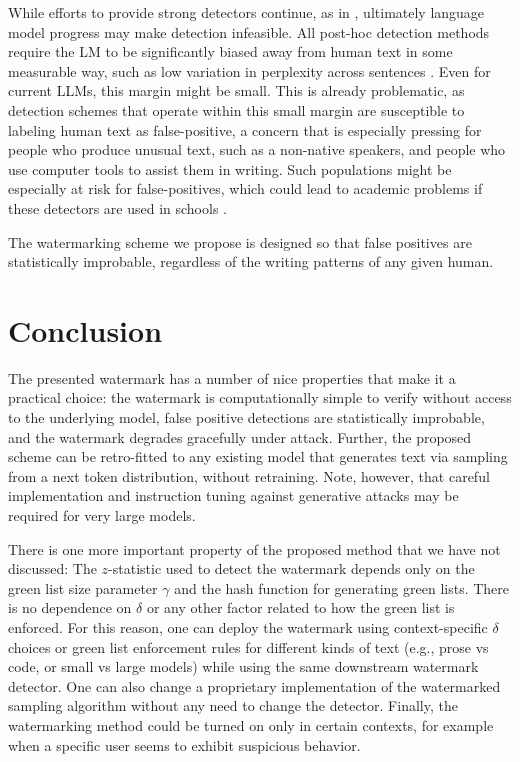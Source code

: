\documentclass{article}
\theoremstyle{plain}
\theoremstyle{definition}
\theoremstyle{remark}
\begin{document}
While efforts to provide strong detectors continue, as in \citet{tian_gptzero_2023}, ultimately language model progress may make detection infeasible. All post-hoc detection methods require the LM to be significantly biased away from human text in some measurable way, such as low variation in perplexity across sentences \citep{tian_gptzero_2023}. Even for current LLMs, this margin might be small. This is already problematic, as detection schemes that operate within this small margin are susceptible to labeling human text as false-positive, a concern that is especially pressing for people who produce unusual text, such as a non-native speakers, and people who use computer tools to assist them in writing. 
Such populations might be especially at risk for false-positives, which could lead to academic problems if these detectors are used in schools \citep{butoi_things_2023}. 

The watermarking scheme we propose is designed so that false positives are statistically improbable, regardless of the writing patterns of any given human.

\vspace{-.2cm}
\section{Conclusion}

The presented watermark has a number of nice properties that make it a practical choice: 
the watermark is computationally simple to verify without access to the underlying model, false positive detections are statistically improbable, and the watermark degrades gracefully under attack. Further, the proposed scheme can be retro-fitted to any existing model that generates text via sampling from a next token distribution, without retraining. Note, however, that careful implementation and instruction tuning against generative attacks may be required for very large models. 

There is one more important property of the proposed method that we have not discussed: The $z$-statistic  used to detect the watermark depends only on the green list size parameter $\gamma$ and the hash function for generating green lists. There is no dependence on $\delta$ or any other factor related to how the green list is enforced. 
For this reason, one can deploy the watermark using context-specific $\delta$ choices or green list enforcement rules for different kinds of text (e.g., prose vs code, or small vs large models) while using the same downstream watermark detector.  One can also change a proprietary implementation of the watermarked sampling algorithm without any need to change the detector.
Finally, the watermarking method could be turned on only in certain contexts, for example when a specific user seems to exhibit suspicious behavior.   
\end{document}
